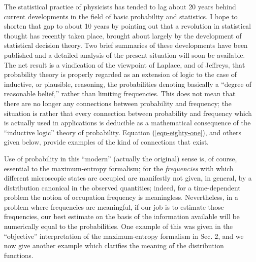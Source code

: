 \documentclass[]{article}
\begin{document}
The statistical practice of physicists has tended to lag about 20 years behind current developments in the field of basic probability and statistics. I hope to shorten that gap to about 10 years by pointing out that a revolution in statistical thought has recently taken place, brought about largely by the development of statistical decision theory. Two brief summaries of these developments have been published\cite{Jaynes-engineering63,Jaynes-cox-review63} and a detailed analysis of the present situation\citep{Jaynes-probability62} will soon be available. The net result is a vindication of the viewpoint of Laplace, and of Jeffreys,\citep{Jeffreys-theory39}  that probability theory is properly regarded as an extension of logic to the case of inductive, or plausible, reasoning, the probabilities denoting basically a ``degree of reasonable belief,'' rather than limiting frequencies. This does not mean that there are no longer any connections between probability and frequency; the situation is rather that every connection between probability and frequency which is actually used in applications is deducible as a mathematical consequence of the ``inductive logic'' theory of probability.\citep{Jaynes-probability62} Equation (\ref{eqn-eighty-one}), and others given below, provide examples of the kind of connections that exist. 

Use of probability in this ``modern'' (actually the original) sense is, of course, essential to the maximum-entropy formalism; for the \emph{frequencies} with which different microscopic states are occupied are manifestly not given, in general, by a distribution canonical in the observed quantities; indeed, for a time-dependent problem the notion of occupation frequency is meaningless. Nevertheless, in a problem where frequencies are meaningful, if our job is to estimate those frequencies, our best estimate on the basis of the information available will be numerically equal to the probabilities. One example of this was given in the ``objective'' interpretation of the maximum-entropy formalism in Sec. 2, and we now give another example which clarifies the meaning of the distribution functions. 
\end{document}

